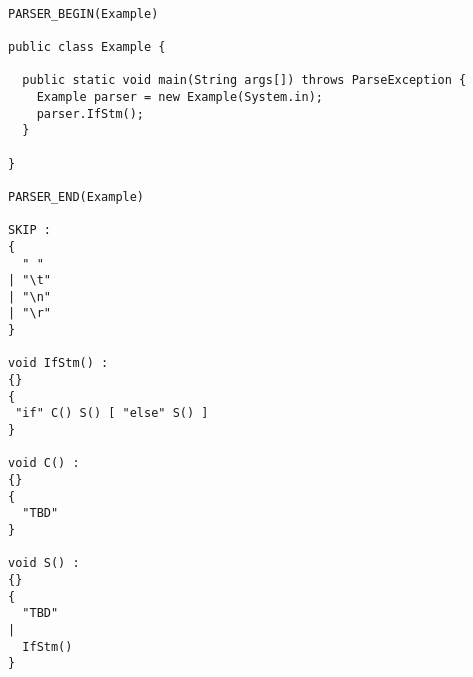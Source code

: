 \begin{lstlisting}[captionpos=b, caption={One of JavaCC's standart examples on how to make a grammar that accepts ``if''-statements.}, label=lst:javacc-grammar-example]

PARSER_BEGIN(Example)

public class Example {

  public static void main(String args[]) throws ParseException {
    Example parser = new Example(System.in);
    parser.IfStm();
  }

}

PARSER_END(Example)

SKIP :
{
  " "
| "\t"
| "\n"
| "\r"
}

void IfStm() :
{}
{
 "if" C() S() [ "else" S() ]
}

void C() :
{}
{
  "TBD"
}

void S() :
{}
{
  "TBD"
|
  IfStm()
}
\end{lstlisting}